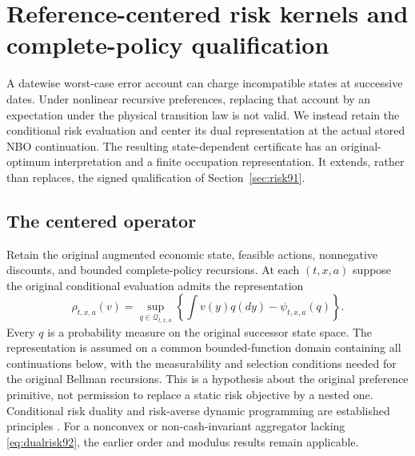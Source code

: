 \section{Reference-centered risk kernels and complete-policy qualification}\label{sec:centeredrisk92}
A datewise worst-case error account can charge incompatible states at successive dates. Under nonlinear recursive preferences, replacing that account by an expectation under the physical transition law is not valid. We instead retain the conditional risk evaluation and center its dual representation at the actual stored NBO continuation. The resulting state-dependent certificate has an original-optimum interpretation and a finite occupation representation. It extends, rather than replaces, the signed qualification of Section~\ref{sec:risk91}.

\subsection{The centered operator}
Retain the original augmented economic state, feasible actions, nonnegative discounts, and bounded complete-policy recursions. At each $(t,x,a)$ suppose the original conditional evaluation admits the representation
\begin{equation}\label{eq:dualrisk92}
 \rho_{t,x,a}(v)=\sup_{q\in\mathcal Q_{t,x,a}}
 \left\{\int v(y)q(dy)-\psi_{t,x,a}(q)\right\}.
\end{equation}
Every $q$ is a probability measure on the original successor state space. The representation is assumed on a common bounded-function domain containing all continuations below, with the measurability and selection conditions needed for the original Bellman recursions. This is a hypothesis about the original preference primitive, not permission to replace a static risk objective by a nested one. Conditional risk duality and risk-averse dynamic programming are established principles \citep{ruszczynski2010risk}. For a nonconvex or non-cash-invariant aggregator lacking \eqref{eq:dualrisk92}, the earlier order and modulus results remain applicable.

